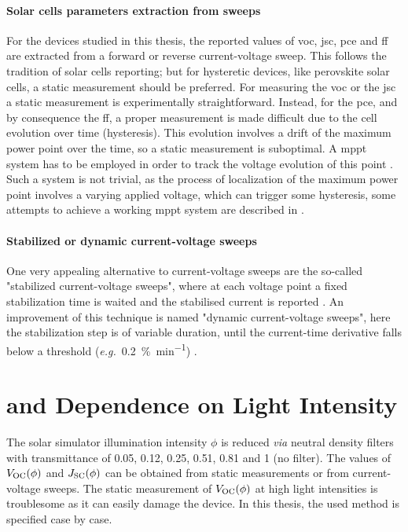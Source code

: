 	\paragraph{Solar cells parameters extraction from sweeps}\label{characterization_hysteresis}
	For the devices studied in this thesis, the reported values of \gls{voc}, \gls{jsc}, \gls{pce} and \gls{ff} are extracted from a forward or reverse current-voltage sweep.
	This follows the tradition of solar cells reporting; but for hysteretic devices, like perovskite solar cells, a static measurement should be preferred.
	For measuring the \gls{voc} or the \gls{jsc} a static measurement is experimentally straightforward.
	Instead, for the \gls{pce}, and by consequence the \gls{ff}, a proper measurement is made difficult due to the cell evolution over time (hysteresis).
	This evolution involves a drift of the maximum power point over the time, so a static measurement is suboptimal.
	A \gls{mppt} system has to be employed in order to track the voltage evolution of this point \cite{Zimmermann2016}.
	Such a system is not trivial, as the process of localization of the maximum power point involves a varying applied voltage, which can trigger some hysteresis, some attempts to achieve a working \gls{mppt} system are described in .

	\paragraph{Stabilized or dynamic current-voltage sweeps}
	One very appealing alternative to current-voltage sweeps are the so-called "stabilized current-voltage sweeps", where at each voltage point a fixed stabilization time is waited and the stabilised current is reported \cite{Unger2014, Christoforo2015, Christians2015}.
	An improvement of this technique is named "dynamic current-voltage sweeps", here the stabilization step is of variable duration, until the current\hyp{}time derivative falls below a threshold (\textsl{e.g.}\ \SI{0.2}{\%\per\minute}) \cite{Dunbar2017,Dunbar2017a}.


\section{ and  Dependence on Light Intensity}
	The solar simulator illumination intensity $\phi$ is reduced \textsl{via} neutral density filters with transmittance of 0.05, 0.12, 0.25, 0.51, 0.81 and 1 (no filter).
	The values of $V_\mathrm{OC}(\phi)$ and $J_\mathrm{SC}(\phi)$ can be obtained from static measurements or from current-voltage sweeps.
	The static measurement of $V_\mathrm{OC}(\phi)$ at high light intensities is troublesome as it can easily damage the device.
	In this thesis, the used method is specified case by case.

